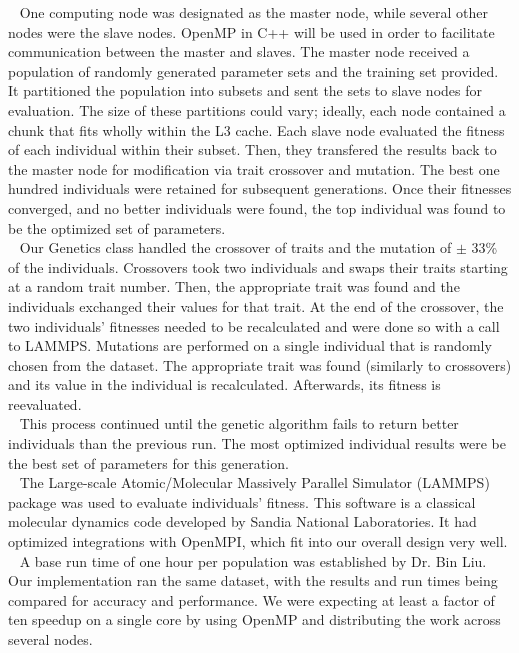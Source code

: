 \documentclass[letterpaper, 12pt]{article}
\begin{document}
\begin{flushleft}
~\newline
One computing node was designated as the master node, while several other nodes were the slave nodes.  OpenMP in C++ will be used in order to facilitate communication between the master and slaves. The master node received a population of randomly generated parameter sets and the training set provided.  It partitioned the population into subsets and sent the sets to slave nodes for evaluation.  The size of these partitions could vary; ideally, each node contained a chunk that fits wholly within the L3 cache. Each slave node evaluated the fitness of each individual within their subset. Then, they transfered the results back to the  master node for modification via trait crossover and mutation. The best one hundred individuals were retained for subsequent generations.  Once their fitnesses converged, and no better individuals were found, the top individual was found to be the optimized set of parameters.\\

~\newline
Our Genetics class handled the crossover of traits and the mutation of $\pm$ 33\% of the individuals.  Crossovers took two individuals and swaps their traits starting at a random trait number.  Then, the appropriate trait was found and the individuals exchanged their values for that trait.  At the end of the crossover, the two individuals' fitnesses needed to be recalculated and were done so with a call to LAMMPS.  Mutations are performed on a single individual that is randomly chosen from the dataset.  The appropriate trait was found (similarly to crossovers) and its value in the individual is recalculated.  Afterwards, its fitness is reevaluated. \\

~\newline 
This process continued until the genetic algorithm fails to return better individuals than the previous run. The most optimized individual results were be the best set of parameters for this generation. \\
~\newline
The Large-scale Atomic/Molecular Massively Parallel Simulator (LAMMPS) package was used to evaluate individuals' fitness.  This software is a classical molecular dynamics code developed by Sandia National Laboratories.  It had optimized integrations with OpenMPI, which fit into our overall design very well. \\
~\newline 
A base run time of one hour per population was established by Dr. Bin Liu.  Our implementation ran the same dataset, with the results and run times being compared for accuracy and performance.  We were expecting at least a factor of ten speedup on a single core by using OpenMP and distributing the work across several nodes.\\


\end{flushleft}
\end{document}
